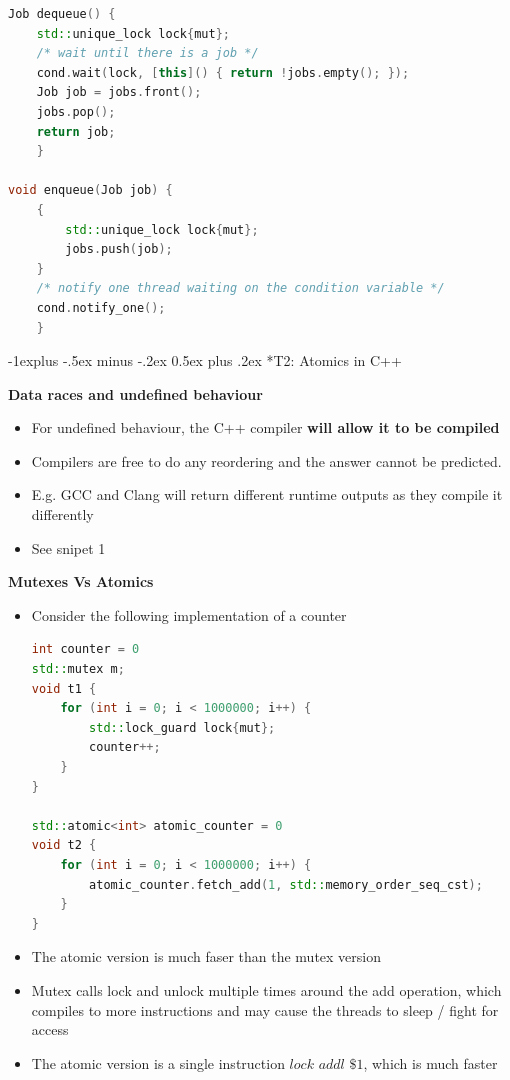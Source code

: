 \documentclass[10pt, landscape]{article}
\makeatletter
\renewcommand{\subsection}{\@startsection{subsection}{2}{0mm}%
                                {-1explus -.5ex minus -.2ex}%
                                {0.5ex plus .2ex}%
                                {\normalfont\normalsize\bfseries}}
\makeatother
\begin{document}
\begin{multicols}{4}
\begin{itemize}
\begin{lstlisting}[language=C++, breaklines=true, breakatwhitespace=true]
Job dequeue() {
    std::unique_lock lock{mut};
    /* wait until there is a job */
    cond.wait(lock, [this]() { return !jobs.empty(); });
    Job job = jobs.front();
    jobs.pop();
    return job;
    }

void enqueue(Job job) {
    {
        std::unique_lock lock{mut};
        jobs.push(job);
    }
    /* notify one thread waiting on the condition variable */
    cond.notify_one();
    }
    \end{lstlisting}
\end{itemize}


\subsection*{T2: Atomics in C++}

\textbf{Data races and undefined behaviour} \\
\begin{itemize}
    \item For undefined behaviour, the C++ compiler \textbf{will allow it to be compiled}
    \item Compilers are free to do any reordering and the answer cannot be predicted. 
    \item E.g. GCC and Clang will return different runtime outputs as they compile it differently
    \item See snipet 1
\end{itemize}

\textbf{Mutexes Vs Atomics} \\
\begin{itemize}
    \item Consider the following implementation of a counter
    \begin{lstlisting}[language=C++, breaklines=true, breakatwhitespace=true]
int counter = 0
std::mutex m;
void t1 {
    for (int i = 0; i < 1000000; i++) {
        std::lock_guard lock{mut};
        counter++;
    }
}

std::atomic<int> atomic_counter = 0
void t2 {
    for (int i = 0; i < 1000000; i++) {
        atomic_counter.fetch_add(1, std::memory_order_seq_cst);
    }
}
    \end{lstlisting}
    \item The atomic version is much faser than the mutex version
    \item Mutex calls lock and unlock multiple times around the add operation, which compiles to more instructions and may cause the threads to sleep / fight for access
    \item The atomic version is a single instruction $lock$ $addl$ $\$1$, which is much faster
\end{itemize}


\end{multicols}
\end{document}
